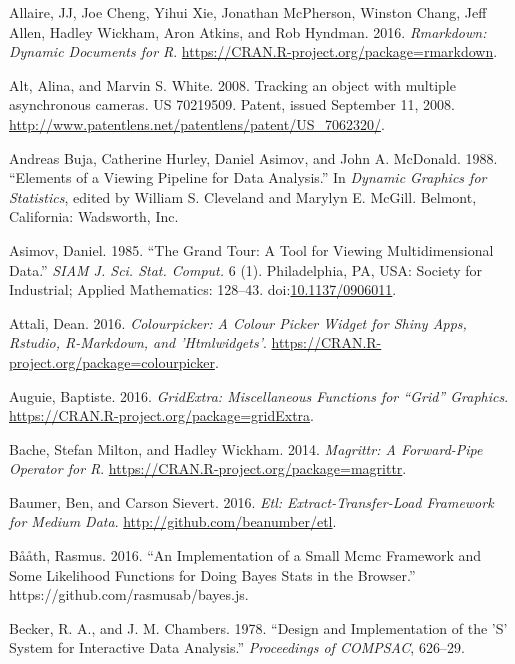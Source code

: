 \documentclass[12pt,]{isuthesis}
\begin{document}
\hypertarget{ref-rmarkdown}{}
Allaire, JJ, Joe Cheng, Yihui Xie, Jonathan McPherson, Winston Chang,
Jeff Allen, Hadley Wickham, Aron Atkins, and Rob Hyndman. 2016.
\emph{Rmarkdown: Dynamic Documents for R}.
\url{https://CRAN.R-project.org/package=rmarkdown}.

\hypertarget{ref-patent}{}
Alt, Alina, and Marvin S. White. 2008. Tracking an object with multiple
asynchronous cameras. US 70219509. Patent, issued September 11, 2008.
\url{http://www.patentlens.net/patentlens/patent/US_7062320/}.

\hypertarget{ref-viewing-pipeline}{}
Andreas Buja, Catherine Hurley, Daniel Asimov, and John A. McDonald.
1988. ``Elements of a Viewing Pipeline for Data Analysis.'' In
\emph{Dynamic Graphics for Statistics}, edited by William S. Cleveland
and Marylyn E. McGill. Belmont, California: Wadsworth, Inc.

\hypertarget{ref-grand-tour}{}
Asimov, Daniel. 1985. ``The Grand Tour: A Tool for Viewing
Multidimensional Data.'' \emph{SIAM J. Sci. Stat. Comput.} 6 (1).
Philadelphia, PA, USA: Society for Industrial; Applied Mathematics:
128--43. doi:\href{https://doi.org/10.1137/0906011}{10.1137/0906011}.

\hypertarget{ref-colourpicker}{}
Attali, Dean. 2016. \emph{Colourpicker: A Colour Picker Widget for Shiny
Apps, Rstudio, R-Markdown, and 'Htmlwidgets'}.
\url{https://CRAN.R-project.org/package=colourpicker}.

\hypertarget{ref-gridExtra}{}
Auguie, Baptiste. 2016. \emph{GridExtra: Miscellaneous Functions for
``Grid'' Graphics}. \url{https://CRAN.R-project.org/package=gridExtra}.

\hypertarget{ref-magrittr}{}
Bache, Stefan Milton, and Hadley Wickham. 2014. \emph{Magrittr: A
Forward-Pipe Operator for R}.
\url{https://CRAN.R-project.org/package=magrittr}.

\hypertarget{ref-etl}{}
Baumer, Ben, and Carson Sievert. 2016. \emph{Etl: Extract-Transfer-Load
Framework for Medium Data}. \url{http://github.com/beanumber/etl}.

\hypertarget{ref-bayes-js}{}
Bååth, Rasmus. 2016. ``An Implementation of a Small Mcmc Framework and
Some Likelihood Functions for Doing Bayes Stats in the Browser.''
https://github.com/rasmusab/bayes.js.

\hypertarget{ref-S:1978}{}
Becker, R. A., and J. M. Chambers. 1978. ``Design and Implementation of
the 'S' System for Interactive Data Analysis.'' \emph{Proceedings of
COMPSAC}, 626--29.
\end{document}
